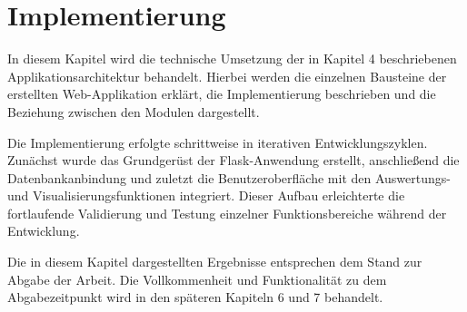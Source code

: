 
\newpage
\section{Implementierung}
\label{sec:implementierung}


In diesem Kapitel wird die technische Umsetzung der in Kapitel 4 beschriebenen Applikationsarchitektur behandelt.
Hierbei werden die einzelnen Bausteine der erstellten Web-Applikation erklärt, die Implementierung beschrieben
und die Beziehung zwischen den Modulen dargestellt.

Die Implementierung erfolgte schrittweise in iterativen Entwicklungszyklen.
Zunächst wurde das Grundgerüst der Flask-Anwendung erstellt, anschließend die Datenbankanbindung und zuletzt die
Benutzeroberfläche mit den Auswertungs- und Visualisierungsfunktionen integriert.
Dieser Aufbau erleichterte die fortlaufende Validierung und Testung einzelner Funktionsbereiche während der Entwicklung.

Die in diesem Kapitel dargestellten Ergebnisse entsprechen dem Stand zur Abgabe der Arbeit.
Die Vollkommenheit und Funktionalität zu dem Abgabezeitpunkt wird in den späteren Kapiteln 6 und 7 behandelt.





